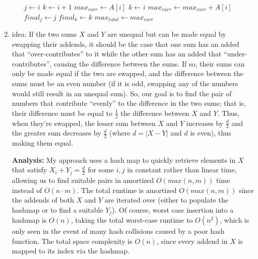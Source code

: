 \documentclass[12pt]{article}
\begin{document}
\begin{enumerate}
\begin{enumerate}
\begin{algorithm}
\begin{algorithmic}
                        \State $j \gets i$
                        \State $k \gets i + 1$
                        \State $max_{curr} \gets A[i]$
                    \Else
                        \State $k \gets i$
                        \State $max_{curr} \gets max_{curr} + A[i]$
                        \State $final_j \gets j$
                        \State $final_k \gets k$
                        \State $max_{total} \gets max_{curr}$
                        \EndIf
                    \EndIf
                \EndFor
            \end{algorithmic}
        \end{algorithm}
    
    \end{enumerate}
    
    \item idea: If the two sums $X$ and $Y$ are unequal but can be made equal by swapping their addends, it should be the 
    case that one sum has an added that ``over-contributes'' to it while the other sum has an added that ``under-contributes'', causing the 
    difference between the sums. If so, their sums can only be made equal if the two are swapped, and the difference between the sums must 
    be an even number (if it is odd, swapping any of the numbers would still result in an unequal sum). So, our goal is to 
    find the pair of numbers that contribute ``evenly'' to the difference in the two sums; that is, their difference must be 
    equal to $\frac{1}{2}$ the difference between $X$ and $Y$. Thus, when they're swapped, the lesser sum between $X$ and $Y$ 
    increases by $\frac{d}{2}$ and the greater sum decreases by $\frac{d}{2}$ (where $d = |X - Y|$ and $d$ is even), thus making them equal.

    \textbf{Analysis:} My approach uses a hash map to quickly retrieve elements in $X$ that satisfy $X_i + Y_j = \frac{d}{2}$ for some $i, j$ in 
    constant rather than linear time, allowing us to find suitable pairs in amortized $O(max(n, m))$ time instead of $O(n \cdot m)$.
    The total runtime is amortized $O(max(n, m))$ since the addends of both $X$ and $Y$ are iterated over (either to populate the hashmap or to find a suitable $Y_j$). Of course, worst 
    case insertion into a hashmap is $O(n)$, taking the total worst-case runtime to $O(n^2)$, which is only seen in the event of 
    many hash collisions caused by a poor hash function. The total space complexity is $O(n)$, since every addend in $X$ is mapped to its index via the hashmap.


\end{enumerate}
\end{document}
